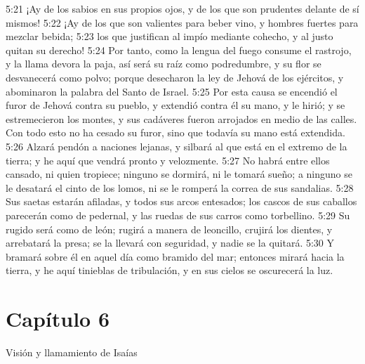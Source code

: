 5:21 ¡Ay de los sabios en sus propios ojos, y de los que son prudentes delante de sí mismos! 
5:22 ¡Ay de los que son valientes para beber vino, y hombres fuertes para mezclar bebida; 
5:23 los que justifican al impío mediante cohecho, y al justo quitan su derecho! 
5:24 Por tanto, como la lengua del fuego consume el rastrojo, y la llama devora la paja, así será su raíz como podredumbre, y su flor se desvanecerá como polvo; porque desecharon la ley de Jehová de los ejércitos, y abominaron la palabra del Santo de Israel. 
5:25 Por esta causa se encendió el furor de Jehová contra su pueblo, y extendió contra él su mano, y le hirió; y se estremecieron los montes, y sus cadáveres fueron arrojados en medio de las calles. Con todo esto no ha cesado su furor, sino que todavía su mano está extendida. 
5:26 Alzará pendón a naciones lejanas, y silbará al que está en el extremo de la tierra; y he aquí que vendrá pronto y velozmente. 
5:27 No habrá entre ellos cansado, ni quien tropiece; ninguno se dormirá, ni le tomará sueño; a ninguno se le desatará el cinto de los lomos, ni se le romperá la correa de sus sandalias. 
5:28 Sus saetas estarán afiladas, y todos sus arcos entesados; los cascos de sus caballos parecerán como de pedernal, y las ruedas de sus carros como torbellino. 
5:29 Su rugido será como de león; rugirá a manera de leoncillo, crujirá los dientes, y arrebatará la presa; se la llevará con seguridad, y nadie se la quitará. 
5:30 Y bramará sobre él en aquel día como bramido del mar; entonces mirará hacia la tierra, y he aquí tinieblas de tribulación, y en sus cielos se oscurecerá la luz. 
\section*{Capítulo 6}
Visión y llamamiento de Isaías 
 
